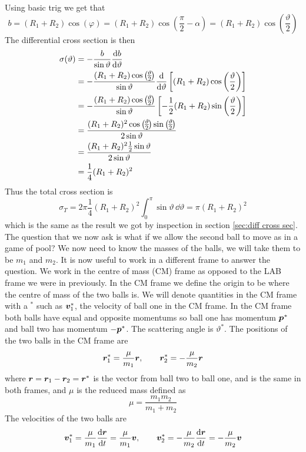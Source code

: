 \documentclass{article}
\begin{document}
    Using basic trig we get that
    \[b = (R_1 + R_2)\cos(\varphi) = (R_1 + R_2)\cos\left(\frac{\pi}{2} - \alpha\right) = (R_1 + R_2)\cos\left(\frac{\vartheta}{2}\right)\]
    The differential cross section is then
    \begin{align*}
        \sigma(\vartheta) &= -\frac{b}{\sin\vartheta}\dv{b}{\vartheta}\\
        &= -\frac{(R_1 + R_2)\cos\left(\!\frac{\vartheta}{2}\!\right)}{\sin\vartheta}\dv{\vartheta}\left[(R_1 + R_2)\cos\left(\frac{\vartheta}{2}\right)\right]\\
        &= -\frac{(R_1 + R_2)\cos\left(\!\frac{\vartheta}{2}\!\right)}{\sin\vartheta}\left[-\frac{1}{2}(R_1 + R_2)\sin\left(\frac{\vartheta}{2}\right)\right]\\
        &= \frac{(R_1 + R_2)^2\cos\left(\!\frac{\vartheta}{2}\!\right)\sin\left(\!\frac{\vartheta}{2}\!\right)}{2\sin\vartheta}\\
        &= \frac{(R_1 + R_2)^2\frac{1}{2}\sin\vartheta}{2\sin\vartheta}\\
        &= \frac{1}{4}(R_1 + R_2)^2
    \end{align*}
    Thus the total cross section is
    \[\sigma_T = 2\pi\frac{1}{4}(R_1 + R_2)^2\int_0^\pi \sin\vartheta\,\dd\vartheta = \pi(R_1 + R_2)^2\]
    which is the same as the result we got by inspection in section \ref{sec:diff cross sec}.
    The question that we now ask is what if we allow the second ball to move as in a game of pool?
    We now need to know the masses of the balls, we will take them to be \(m_1\) and \(m_2\).
    It is now useful to work in a different frame to answer the question.
    We work in the centre of mass (CM) frame as opposed to the LAB frame we were in previously.
    In the CM frame we define the origin to be where the centre of mass of the two balls is.
    We will denote quantities in the CM frame with a \(^*\) such as \(\bm{v}_1^*\), the velocity of ball one in the CM frame.
    In the CM frame both balls have equal and opposite momentums so ball one has momentum \(\bm{p}^*\) and ball two has momentum \(-\bm{p}^*\).
    The scattering angle is \(\vartheta^*\).
    The positions of the two balls in the CM frame are
    \[\bm{r}_1^* = \frac{\mu}{m_1}\bm{r},\qquad \bm{r}_2^* = -\frac{\mu}{m_2}\bm{r}\]
    where \(\bm{r} = \bm{r}_1 - \bm{r}_2 = \bm{r}^*\) is the vector from ball two to ball one, and is the same in both frames, and \(\mu\) is the reduced mass defined as
    \[\mu = \frac{m_1 m_2}{m_1 + m_2}\]
    The velocities of the two balls are
    \[\bm{v}_1^* = \frac{\mu}{m_1}\dv{\bm{r}}{t} = \frac{\mu}{m_1}\bm{v},\qquad \bm{v}_2^* = -\frac{\mu}{m_2}\dv{\bm{r}}{t} = -\frac{\mu}{m_2}\bm{v}\]
\end{document}
